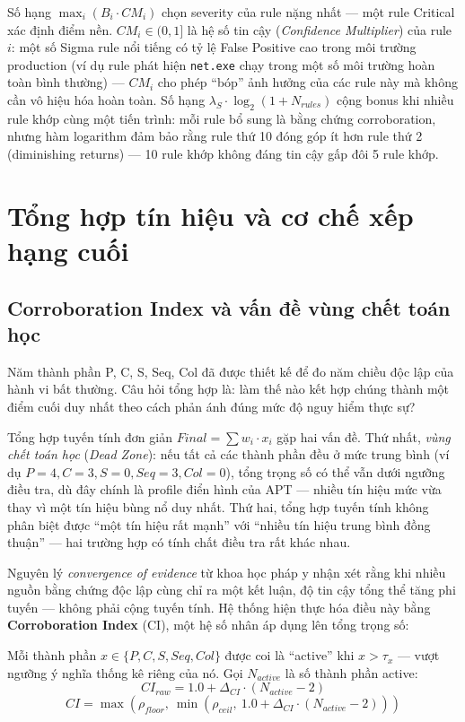\documentclass[../main.tex]{subfiles}
\begin{document}
Số hạng $\max_i(B_i \cdot CM_i)$ chọn severity của rule nặng nhất — một rule Critical xác định điểm nền. $CM_i \in (0, 1]$ là hệ số tin cậy (\textit{Confidence Multiplier}) của rule $i$: một số Sigma rule nổi tiếng có tỷ lệ False Positive cao trong môi trường production (ví dụ rule phát hiện \texttt{net.exe} chạy trong một số môi trường hoàn toàn bình thường) — $CM_i$ cho phép ``bóp'' ảnh hưởng của các rule này mà không cần vô hiệu hóa hoàn toàn. Số hạng $\lambda_S \cdot \log_2(1 + N_{rules})$ cộng bonus khi nhiều rule khớp cùng một tiến trình: mỗi rule bổ sung là bằng chứng corroboration, nhưng hàm logarithm đảm bảo rằng rule thứ 10 đóng góp ít hơn rule thứ 2 (diminishing returns) — 10 rule khớp không đáng tin cậy gấp đôi 5 rule khớp.

\section{Tổng hợp tín hiệu và cơ chế xếp hạng cuối}
\label{section:2.5}

\subsection{Corroboration Index và vấn đề vùng chết toán học}
\label{subsection:2.5.1}

Năm thành phần P, C, S, Seq, Col đã được thiết kế để đo năm chiều độc lập của hành vi bất thường. Câu hỏi tổng hợp là: làm thế nào kết hợp chúng thành một điểm cuối duy nhất theo cách phản ánh đúng mức độ nguy hiểm thực sự?

Tổng hợp tuyến tính đơn giản $Final = \sum w_i \cdot x_i$ gặp hai vấn đề. Thứ nhất, \textit{vùng chết toán học} (\textit{Dead Zone}): nếu tất cả các thành phần đều ở mức trung bình (ví dụ $P=4, C=3, S=0, Seq=3, Col=0$), tổng trọng số có thể vẫn dưới ngưỡng điều tra, dù đây chính là profile điển hình của APT — nhiều tín hiệu mức vừa thay vì một tín hiệu bùng nổ duy nhất. Thứ hai, tổng hợp tuyến tính không phân biệt được ``một tín hiệu rất mạnh'' với ``nhiều tín hiệu trung bình đồng thuận'' — hai trường hợp có tính chất điều tra rất khác nhau.

Nguyên lý \textit{convergence of evidence} từ khoa học pháp y nhận xét rằng khi nhiều nguồn bằng chứng độc lập cùng chỉ ra một kết luận, độ tin cậy tổng thể tăng phi tuyến — không phải cộng tuyến tính. Hệ thống hiện thực hóa điều này bằng \textbf{Corroboration Index} (CI), một hệ số nhân áp dụng lên tổng trọng số:

Mỗi thành phần $x \in \{P, C, S, Seq, Col\}$ được coi là ``active'' khi $x > \tau_x$ — vượt ngưỡng ý nghĩa thống kê riêng của nó. Gọi $N_{active}$ là số thành phần active:
\begin{equation}
    CI_{raw} = 1.0 + \Delta_{CI} \cdot (N_{active} - 2) \tag{1.24}
\end{equation}
\begin{equation}
    CI = \max\!\left(\rho_{floor},\ \min\!\left(\rho_{ceil},\ 1.0 + \Delta_{CI} \cdot (N_{active} - 2)\right)\right) \tag{1.25}
\end{equation}
\end{document}
